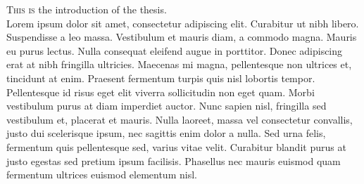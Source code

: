 


\pagestyle{plain}

\lettrine{T}{his is} the introduction of the thesis. \\


Lorem ipsum dolor sit amet, consectetur adipiscing elit. Curabitur ut nibh libero. Suspendisse a leo massa. Vestibulum et mauris diam, a commodo magna. Mauris eu purus lectus. Nulla consequat eleifend augue in porttitor. Donec adipiscing erat at nibh fringilla ultricies. Maecenas mi magna, pellentesque non ultrices et, tincidunt at enim. Praesent fermentum turpis quis nisl lobortis tempor. Pellentesque id risus eget elit viverra sollicitudin non eget quam. Morbi vestibulum purus at diam imperdiet auctor. Nunc sapien nisl, fringilla sed vestibulum et, placerat et mauris. Nulla laoreet, massa vel consectetur convallis, justo dui scelerisque ipsum, nec sagittis enim dolor a nulla. Sed urna felis, fermentum quis pellentesque sed, varius vitae velit. Curabitur blandit purus at justo egestas sed pretium ipsum facilisis. Phasellus nec mauris euismod quam fermentum ultrices euismod elementum nisl.

